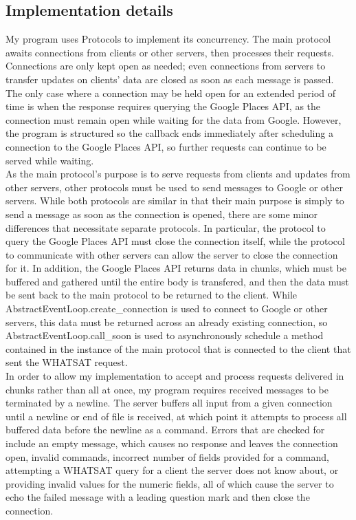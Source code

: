 \documentclass[letterpaper,twocolumn,10pt]{article}
\begin{document}
\subsection{Implementation details}
My program uses Protocols to implement its concurrency. The main protocol awaits connections from clients or other servers, then processes their requests. Connections are only kept open as needed; even connections from servers to transfer updates on clients' data are closed as soon as each message is passed. The only case where a connection may be held open for an extended period of time is when the response requires querying the Google Places API, as the connection must remain open while waiting for the data from Google. However, the program is structured so the callback ends immediately after scheduling a connection to the Google Places API, so further requests can continue to be served while waiting.\\
As the main protocol's purpose is to serve requests from clients and updates from other servers, other protocols must be used to send messages to Google or other servers. While both protocols are similar in that their main purpose is simply to send a message as soon as the connection is opened, there are some minor differences that necessitate separate protocols. In particular, the protocol to query the Google Places API must close the connection itself, while the protocol to communicate with other servers can allow the server to close the connection for it. In addition, the Google Places API returns data in chunks, which must be buffered and gathered until the entire body is transfered, and then the data must be sent back to the main protocol to be returned to the client. While AbstractEventLoop.create\_connection is used to connect to Google or other servers, this data must be returned across an already existing connection, so AbstractEventLoop.call\_soon is used to asynchronously schedule a method contained in the instance of the main protocol that is connected to the client that sent the WHATSAT request.\\
In order to allow my implementation to accept and process requests delivered in chunks rather than all at once, my program requires received messages to be terminated by a newline.
The server buffers all input from a given connection until a newline or end of file is received, at which point it attempts to process all buffered data before the newline as a command. Errors that are checked for include an empty message, which causes no response and leaves the connection open, invalid commands, incorrect number of fields provided for a command, attempting a WHATSAT query for a client the server does not know about, or providing invalid values for the numeric fields, all of which cause the server to echo the failed message with a leading question mark and then close the connection.\\
\end{document}
